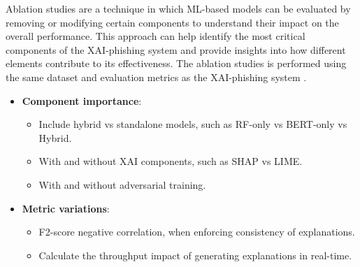 \noindent Ablation studies are a technique in which ML-based models can be evaluated by removing or modifying certain components to understand their impact on the overall performance. This approach can help identify the most critical components of the XAI-phishing system and provide insights into how different elements contribute to its effectiveness. The ablation studies is performed using the same dataset and evaluation metrics as the XAI-phishing system \citep{do2024integrated}.

\begin{itemize}
  \item \textbf{Component importance}:
  \begin{itemize}
    \item Include hybrid vs standalone models, such as RF-only vs BERT-only vs Hybrid.
    \item With and without XAI components, such as SHAP vs LIME.
    \item With and without adversarial training.
  \end{itemize}
  \item \textbf{Metric variations}:
  \begin{itemize}
    \item F2-score negative correlation, when enforcing consistency of explanations.
    \item Calculate the throughput impact of generating explanations in real-time.
  \end{itemize}
\end{itemize}
